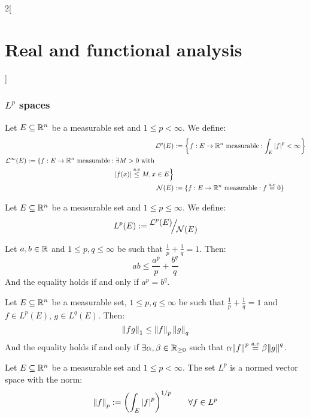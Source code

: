 \documentclass[../../../main_math.tex]{subfiles}
\begin{document}
\begin{multicols}{2}[\section{Real and functional analysis}]
  \subsubsection{\texorpdfstring{$L^p$}{Lp} spaces}
  \begin{definition}
    Let $E\subseteq\mathbb{R}^n$ be a measurable set and $1\leq p<\infty$. We define:
    \begin{align*}
      \mathcal{L}^p(E) & :=\left\{{f}:E\rightarrow \RR^n\text{ measurable}:\int_E\abs{{f}}^p<\infty\right\}                                                                                                          \\
      \begin{split}
        \mathcal{L}^\infty(E) &:=\left\{{f}:E\rightarrow \RR^n\text{ measurable}:\exists M>0\text{ with }\right.\\&\hspace{4.5cm}\left.\abs{{f}(x)}\almoste{\leq} M, x\in E\right\}
      \end{split} \\
      \mathcal{N}(E)   & :=\{{f}:E\rightarrow \RR^n\text{ measurable}:{f}\almoste{=} 0\}
    \end{align*}
  \end{definition}
  \begin{definition}
    Let $E\subseteq\mathbb{R}^n$ be a measurable set and $1\leq p\leq\infty$. We define: $$L^p(E):=\quot{\mathcal{L}^p(E)}{\mathcal{N}(E)}$$
  \end{definition}
  \begin{lemma}
    Let $a,b\in\mathbb{R}$ and $1\leq p,q\leq \infty$ be such that $\frac{1}{p}+\frac{1}{q}=1$. Then:
    $$ab\leq\frac{a^p}{p}+\frac{b^q}{q}$$
    And the equality holds if and only if $a^p=b^q$.
  \end{lemma}
  \begin{lemma}
    Let $E\subseteq\mathbb{R}^n$ be a measurable set, $1\leq p,q\leq \infty$ be such that $\frac{1}{p}+\frac{1}{q}=1$ and ${f}\in L^p(E)$, ${g}\in L^q(E)$. Then:
    $$\left\|{fg}\right\|_1\leq\left\|{f}\right\|_p\left\|{g}\right\|_q$$
    And the equality holds if and only if $\exists \alpha,\beta\in\mathbb{R}_{\geq 0}$ such that $\alpha{\left\|{f}\right\|}^p\overset{\text{a.e}}{=}\beta{\left\|{g}\right\|}^q$.
  \end{lemma}
  \begin{proposition}
    Let $E\subseteq\mathbb{R}^n$ be a measurable set and $1\leq p<\infty$. The set $L^p$ is a normed vector space with the norm: $$\left\|{f}\right\|_p:={\left(\int_E\abs{{f}}^p\right)}^{1/p}\qquad\forall{f}\in L^p$$

\end{proposition}
\end{multicols}
\end{document}
